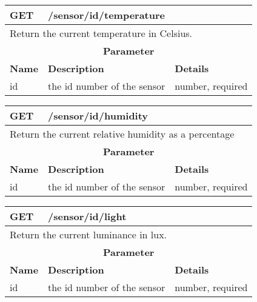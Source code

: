 \begin{table}[h]
\begin{tabular}{@{}lll@{}}
\toprule
\textbf{GET} & \multicolumn{2}{l}{/sensor/{id}/temperature} \\ \midrule
\multicolumn{3}{l}{Return the current temperature in Celsius.} \\
\multicolumn{3}{c}{\textbf{Parameter}} \\
\textbf{Name} & \textbf{Description} & \textbf{Details} \\
id & the id number of the sensor & number, required \\ \bottomrule
\end{tabular}
\end{table}
\begin{table}[h]
\begin{tabular}{@{}lll@{}}
\toprule
\textbf{GET} & \multicolumn{2}{l}{/sensor/{id}/humidity} \\ \midrule
\multicolumn{3}{l}{Return the current relative humidity as a percentage} \\
\multicolumn{3}{c}{\textbf{Parameter}} \\
\textbf{Name} & \textbf{Description} & \textbf{Details} \\
id & the id number of the sensor & number, required \\ \bottomrule
\end{tabular}
\end{table}
\begin{table}[h]
\begin{tabular}{@{}lll@{}}
\toprule
\textbf{GET} & \multicolumn{2}{l}{/sensor/{id}/light} \\ \midrule
\multicolumn{3}{l}{Return the current luminance in lux.} \\
\multicolumn{3}{c}{\textbf{Parameter}} \\
\textbf{Name} & \textbf{Description} & \textbf{Details} \\
id & the id number of the sensor & number, required \\ \bottomrule
\end{tabular}
\end{table}